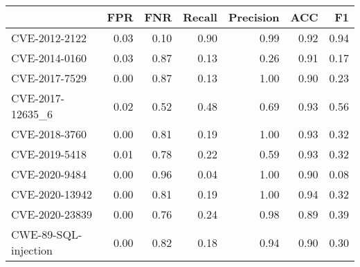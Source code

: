 \begin{tabular}{lrrrrrr}
\toprule
{} &  FPR &  FNR &  Recall &  Precision &  ACC &   F1 \\
\midrule
CVE-2012-2122        & 0.03 & 0.10 &    0.90 &       0.99 & 0.92 & 0.94 \\
CVE-2014-0160        & 0.03 & 0.87 &    0.13 &       0.26 & 0.91 & 0.17 \\
CVE-2017-7529        & 0.00 & 0.87 &    0.13 &       1.00 & 0.90 & 0.23 \\
CVE-2017-12635\_6     & 0.02 & 0.52 &    0.48 &       0.69 & 0.93 & 0.56 \\
CVE-2018-3760        & 0.00 & 0.81 &    0.19 &       1.00 & 0.93 & 0.32 \\
CVE-2019-5418        & 0.01 & 0.78 &    0.22 &       0.59 & 0.93 & 0.32 \\
CVE-2020-9484        & 0.00 & 0.96 &    0.04 &       1.00 & 0.90 & 0.08 \\
CVE-2020-13942       & 0.00 & 0.81 &    0.19 &       1.00 & 0.94 & 0.32 \\
CVE-2020-23839       & 0.00 & 0.76 &    0.24 &       0.98 & 0.89 & 0.39 \\
CWE-89-SQL-injection & 0.00 & 0.82 &    0.18 &       0.94 & 0.90 & 0.30 \\
\bottomrule
\end{tabular}
